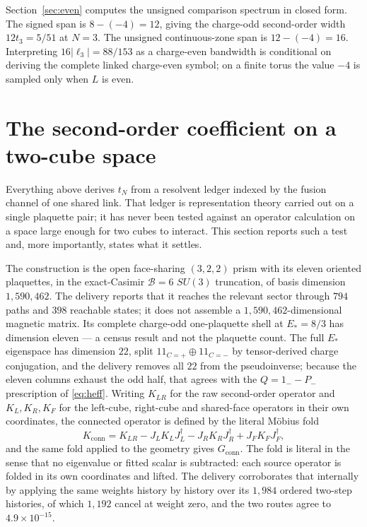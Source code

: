 \documentclass[11pt]{article}
\theoremstyle{plain}
\theoremstyle{definition}
\theoremstyle{remark}
\newcommand{\chk}[1]{}
\newcommand{\dg}{^{\dagger}}
\begin{document}
Section~\ref{sec:even} computes the unsigned comparison spectrum in closed
form. The signed span is $8-(-4)=12$, giving the charge-odd second-order width
$12t_3=5/51$ at $N=3$. The unsigned continuous-zone span is
$12-(-4)=16$. Interpreting $16|\ell_3|=88/153$ as a charge-even bandwidth is
conditional on deriving the complete linked charge-even symbol; on a finite
torus the value $-4$ is sampled only when $L$ is even.
\chk{the two band spans ARE the two incidence spectra}

\section{The second-order coefficient on a two-cube space}
\label{sec:twocube}

Everything above derives $t_N$ from a resolvent ledger indexed by the fusion
channel of one shared link. That ledger is representation theory carried out on
a single plaquette pair; it has never been tested against an operator
calculation on a space large enough for two cubes to interact. This section
reports such a test and, more importantly, states what it settles.

The construction is the open face-sharing $(3,2,2)$ prism with its eleven
oriented plaquettes, in the exact-Casimir $\mathcal B=6$ $SU(3)$ truncation, of
basis dimension $1{,}590{,}462$. The delivery reports that it reaches the
relevant sector through $794$ paths and $398$ reachable states; it does not
assemble a $1{,}590{,}462$-dimensional magnetic matrix. Its complete
charge-odd one-plaquette shell at
$E_*=8/3$ has dimension eleven --- a census result and not the plaquette count.
The full $E_*$ eigenspace has dimension $22$, split $11_{C=+}\oplus11_{C=-}$ by
tensor-derived charge conjugation, and the delivery removes all $22$ from the
pseudoinverse; because the eleven columns exhaust the odd half, that agrees
with the $Q=1_--P_-$ prescription of \eqref{eq:heff}. Writing $K_{LR}$ for the raw second-order
operator and $K_L,K_R,K_F$ for the left-cube, right-cube and shared-face
operators in their own coordinates, the connected operator is defined by the
literal M\"obius fold
\begin{equation}\label{eq:mobius}
  K_{\mathrm{conn}}=K_{LR}-J_LK_LJ_L\dg-J_RK_RJ_R\dg+J_FK_FJ_F\dg ,
\end{equation}
and the same fold applied to the geometry gives $G_{\mathrm{conn}}$. The fold
is literal in the sense that no eigenvalue or fitted scalar is subtracted: each
source operator is folded in its own coordinates and lifted. The delivery
corroborates that internally by applying the same weights history by history
over its $1{,}984$ ordered two-step histories, of which $1{,}192$ cancel at
weight zero, and the two routes agree to $4.9\times10^{-15}$.
\end{document}

